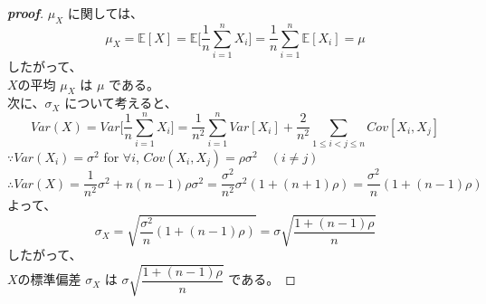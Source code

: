 \documentclass[a4paper,11pt]{jsarticle}
\begin{document}
\begin{proof}[\textbf{proof}]
$\mu_X$ に関しては、\\
$$
  \mu_X = \mathbb{E}[X]=\mathbb{E}\Bigg[\dfrac{1}{n}\sum_{i=1}^n X_i\Bigg]=\dfrac{1}{n}\sum_{i=1}^n \mathbb{E}[X_i]=\mu
$$
したがって、\\
$ X $の平均 $ \mu_X $ は $ \mu $ である。\\
次に、$ \sigma_X $ について考えると、\\
\begin{equation*}
  Var(X) = Var\Bigg[\dfrac{1}{n}\sum_{i=1}^n X_i\Bigg]=\dfrac{1}{n^2}\sum_{i=1}^n Var[X_i]+\dfrac{2}{n^2}\sum_{1\leq i<j\leq n} Cov[X_i,X_j]
\end{equation*}
$ \because Var(X_i) = \sigma^2$ for $\forall i$, $Cov(X_i,X_j) = \rho \sigma^2\quad (i\neq j)$\\
$$
  \therefore Var(X) = \dfrac{1}{n^2}\sigma^2 + n(n-1) \rho \sigma^2  =\dfrac{\sigma^2}{n^2} \sigma^2 (1+(n+1)\rho)=\dfrac{\sigma^2}{n}(1+(n-1)\rho)
$$
よって、\\
$$\sigma_X = \sqrt{\dfrac{\sigma^2}{n} (1+(n-1)\rho)} = \sigma \sqrt{\dfrac{1+(n-1)\rho}{n}}$$
したがって、\\
$ X $の標準偏差 $ \sigma_X $ は $ \sigma \sqrt{\dfrac{1+(n-1)\rho}{n}} $ である。
\end{proof}
\end{document}
